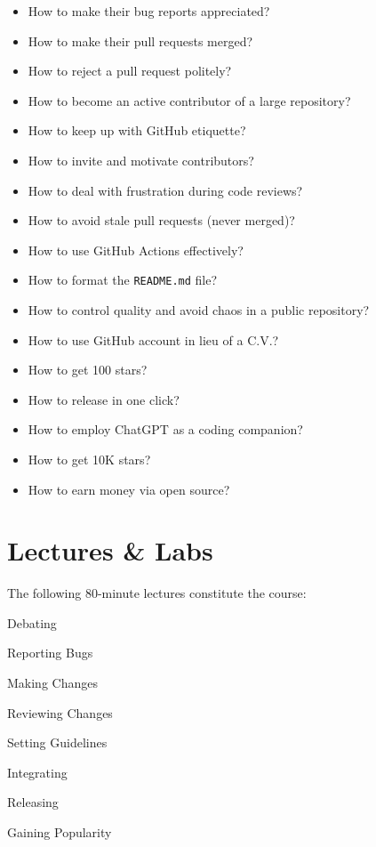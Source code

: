 \documentclass[nobrand,anonymous,nodate,nosecurity]{huawei}
\begin{document}
{\begin{itemize}
\item How to make their bug reports appreciated?
\item How to make their pull requests merged?
\item How to reject a pull request politely?
\item How to become an active contributor of a large repository?
\item How to keep up with GitHub etiquette?
\item How to invite and motivate contributors?
\item How to deal with frustration during code reviews?
\item How to avoid stale pull requests (never merged)?
\item How to use GitHub Actions effectively?
\item How to format the \texttt{README.md} file?
\item How to control quality and avoid chaos in a public repository?
\item How to use GitHub account in lieu of a C.V.?
\item How to get 100 stars?
\item How to release in one click?
\item How to employ ChatGPT as a coding companion?
\item How to get 10K stars?
\item How to earn money via open source?
\end{itemize}

\newpage
\section*{Lectures \& Labs}

The following 80-minute lectures constitute the course:

\begin{lectures}
\item Debating
\item Reporting Bugs
\item Making Changes
\item Reviewing Changes
\item Setting Guidelines
\item Integrating
\item Releasing
\item Gaining Popularity
\end{lectures}

}
\end{document}
